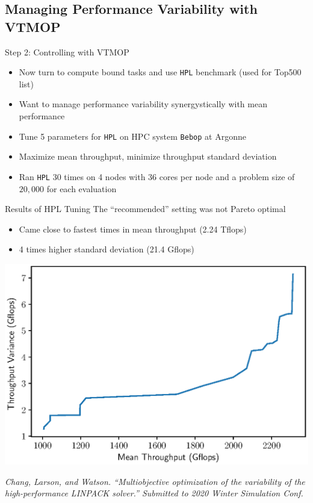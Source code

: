 \documentclass[xcolor=dvipsnames]{beamer}
\begin{document}
\subsection{Managing Performance Variability with VTMOP}
\begin{frame}{Step 2: Controlling with VTMOP}
\begin{itemize}
\item Now turn to compute bound tasks and use {\tt HPL} benchmark
(used for Top500 list)
\item Want to manage performance variability synergystically with mean
performance
\item Tune 5 parameters for {\tt HPL} on HPC system {\tt Bebop} at Argonne
\item Maximize mean throughput, minimize throughput standard deviation
\item Ran {\tt HPL} 30 times on 4 nodes with 36 cores per node and a problem
size of $20,000$ for each evaluation
\end{itemize}
\end{frame}
\begin{frame}{Results of HPL Tuning}
The ``recommended'' setting was not Pareto optimal
\begin{itemize}
\item Came close to fastest times in mean throughput (2.24 Tflops)
\item 4 times higher standard deviation (21.4 Gflops)
\end{itemize}
\centerline{\includegraphics[width=.55\textwidth]{hpl_n20k_pf.eps}}
\medskip
{\it \small Chang, Larson, and Watson.
``Multiobjective optimization of the variability of the high-performance
LINPACK solver.'' Submitted to 2020 Winter Simulation Conf.}
\end{frame}

\end{document}
